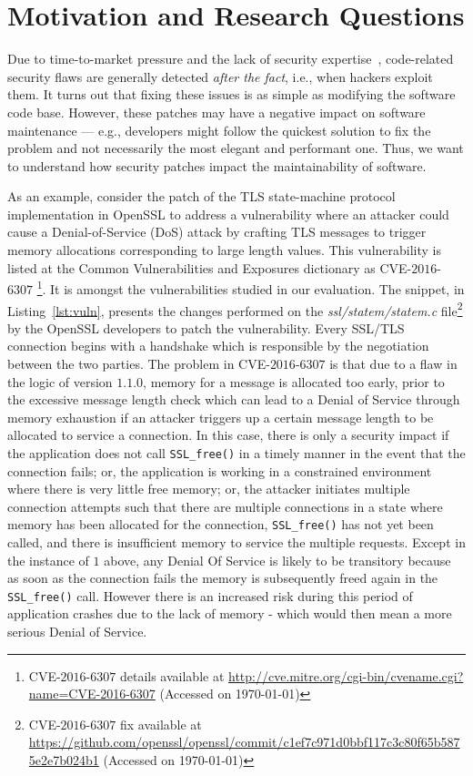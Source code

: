 \documentclass[10pt,conference]{IEEEtran}
\makeatletter
\newcommand\footnoteref[1]{\protected@xdef\@thefnmark{\ref{#1}}\@footnotemark}
\makeatother
\begin{document}
\section{Motivation and Research Questions}\label{sec:motivation}
%
Due to time-to-market pressure and the lack of security expertise~\cite{8077802}, code-related
security flaws are generally detected \textit{after the fact}, i.e., when
hackers exploit them. It turns out that fixing these issues is as simple as
modifying the software code base. However, these patches may have a
negative impact on software maintenance --- e.g., developers might follow the
quickest solution to fix the problem and not necessarily the most elegant and
performant one. Thus, we want to understand how security patches impact
the maintainability of software. 

As an example, consider the patch of the TLS state-machine protocol implementation in OpenSSL\footnoteref{openssl} to address a vulnerability where an attacker could cause a Denial-of-Service
(DoS) attack by crafting TLS messages to trigger memory allocations
corresponding to large length values. This vulnerability is listed at the Common
Vulnerabilities and Exposures dictionary as CVE-$2016$-$6307$ \footnote{CVE-$2016$-$6307$
details available at \url{http://cve.mitre.org/cgi-bin/cvename.cgi?name=CVE-2016-6307}
(Accessed on \today{})}. It is amongst the vulnerabilities studied in our
evaluation. The snippet, in Listing~\ref{lst:vuln}, presents the changes performed on the
\emph{ssl/statem/statem.c} file\footnote{CVE-$2016$-$6307$ fix available  at
\url{https://github.com/openssl/openssl/commit/c1ef7c971d0bbf117c3c80f65b5875e2e7b024b1}
(Accessed on \today{})} by the OpenSSL developers to patch the vulnerability. Every SSL/TLS connection begins with a handshake which is responsible by the
negotiation between the two parties. The problem in
CVE-$2016$-$6307$ is that due to a flaw in the logic of version $1.1.0$,
memory for a message is allocated too early, prior to the excessive
message length check which can lead to a Denial of Service through memory
exhaustion if an attacker triggers up a certain message length to be allocated to service a
connection. In this case, there is only a security impact if the application does not call  \texttt{SSL\_free()} in a timely manner in the
event that the connection fails;
or, the application is working in a constrained environment where there
is very little free memory;
or, the attacker initiates multiple connection attempts such that there
are multiple connections in a state where memory has been allocated for
the connection, \texttt{SSL\_free()} has not yet been called, and there is
insufficient memory to service the multiple requests. Except in the instance of $1$ above, any Denial Of Service is likely to
be transitory because as soon as the connection fails the memory is
subsequently freed again in the \texttt{SSL\_free()} call. However there is an
increased risk during this period of application crashes due to the lack
of memory - which would then mean a more serious Denial of Service.
\end{document}
